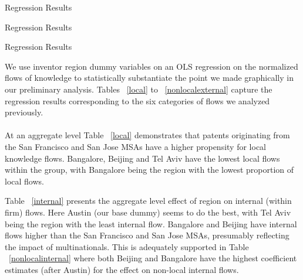 \documentclass[12pt]{article}
\begin{document}
\begin{table}
\caption{Regression Results}


\end{table}

\begin{table}
\caption{Regression Results}


\end{table}

\begin{table}
\caption{Regression Results}

\end{table}

We use inventor region dummy variables on an OLS regression on the normalized flows of knowledge to statistically substantiate the point we made graphically in our preliminary analysis. Tables ~\ref{local} to ~\ref{nonlocalexternal} capture the regression results corresponding to the six categories of flows we analyzed previously.
\\\\
At an aggregate level Table ~\ref{local} demonstrates that patents originating from the San Francisco and San Jose MSAs have a higher propensity for local knowledge flows. Bangalore, Beijing and Tel Aviv have the lowest local flows within the group, with Bangalore being the region with the lowest proportion of local flows.

Table ~\ref{internal} presents the aggregate level effect of region on internal (within firm) flows.  Here Austin (our base dummy) seems to do the best, with Tel Aviv being the region with the least internal flow. Bangalore and Beijing have internal flows higher than the San Francisco and San Jose MSAs, presumably reflecting the impact of multinationals. This is adequately supported in Table ~\ref{nonlocalinternal} where both Beijing and Bangalore have the highest coefficient estimates (after Austin) for the effect on non-local internal flows.
\end{document}
